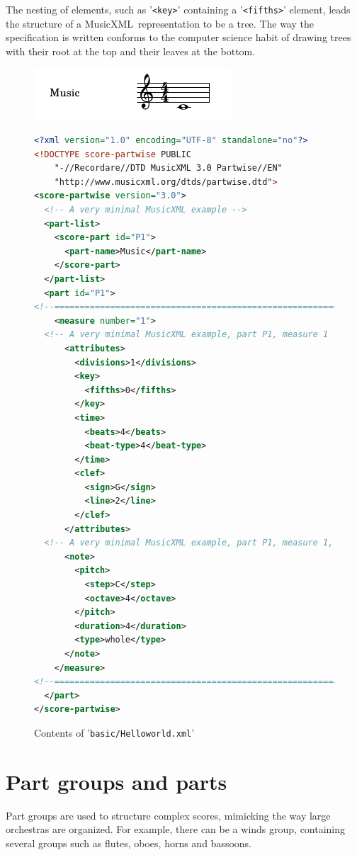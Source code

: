 \documentclass[12pt,a4paper]{article}
\newcommand{\mxml}{MusicXML}
\begin{document}
The nesting of elements, such as {'\tt <key>}' containing a {'\tt <fifths>}' element, leads the structure of a \mxml\ representation to be a tree. The way the specification is written conforms to the computer science habit of drawing trees with their root at the top and their leaves at the bottom.

\begin{figure}
\caption{Contents of {'\tt basic/Helloworld.xml}'}\label{helloworld}
\includegraphics{HelloWorld.png}

\begin{lstlisting}[language=XML]
<?xml version="1.0" encoding="UTF-8" standalone="no"?>
<!DOCTYPE score-partwise PUBLIC
    "-//Recordare//DTD MusicXML 3.0 Partwise//EN"
    "http://www.musicxml.org/dtds/partwise.dtd">
<score-partwise version="3.0">
  <!-- A very minimal MusicXML example -->
  <part-list>
    <score-part id="P1">
      <part-name>Music</part-name>
    </score-part>
  </part-list>
  <part id="P1">
<!--=========================================================-->
    <measure number="1">
  <!-- A very minimal MusicXML example, part P1, measure 1 -->
      <attributes>
        <divisions>1</divisions>
        <key>
          <fifths>0</fifths>
        </key>
        <time>
          <beats>4</beats>
          <beat-type>4</beat-type>
        </time>
        <clef>
          <sign>G</sign>
          <line>2</line>
        </clef>
      </attributes>
  <!-- A very minimal MusicXML example, part P1, measure 1, before first note -->
      <note>
        <pitch>
          <step>C</step>
          <octave>4</octave>
        </pitch>
        <duration>4</duration>
        <type>whole</type>
      </note>
    </measure>
<!--=========================================================-->
  </part>
</score-partwise>
\end{lstlisting}
\end{figure}

\section{Part groups and parts}

Part groups are used to structure complex scores, mimicking the way large orchestras are organized. For example, there can be a winds group, containing several groups such as flutes, oboes, horns and bassoons.
\end{document}

